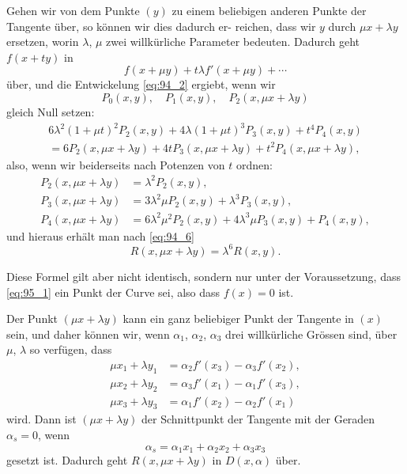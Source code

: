 \documentclass[12pt,a4paper]{article}
\theoremstyle{plain}
\theoremstyle{definition}
\theoremstyle{remark}
\begin{document}
Gehen wir von dem Punkte $(y)$ zu einem beliebigen anderen
Punkte der Tangente über, so können wir dies dadurch er-
reichen, dass wir $y$ durch $\mu x + \lambda y$ ersetzen, worin $\lambda$, $\mu$ zwei
willkürliche Parameter bedeuten. Dadurch geht $f(x + ty)$ in
\begin{equation*}
f(x + \mu y) + t\lambda f'(x + \mu y) + \cdots
\end{equation*}
über, und die Entwickelung \eqref{eq:94_2} ergiebt, wenn wir
\begin{equation*}
P_0(x, y), \quad P_1(x, y), \quad P_2(x, \mu x + \lambda y)
\end{equation*}
gleich Null setzen:
\begin{multline*}
6\lambda^2(1 + \mu t)^2 P_2(x, y) + 4\lambda(1 + \mu t)^3 P_3(x, y) + t^4 P_4(x, y) \\
= 6P_2(x, \mu x + \lambda y) + 4t P_3(x, \mu x + \lambda y) + t^2 P_4(x, \mu x + \lambda y),
\end{multline*}
also, wenn wir beiderseits nach Potenzen von $t$ ordnen:
\begin{align*}
P_2(x, \mu x + \lambda y) &= \lambda^2 P_2(x, y), \\
P_3(x, \mu x + \lambda y) &= 3\lambda^2 \mu P_2(x, y) + \lambda^3 P_3(x, y), \\
P_4(x, \mu x + \lambda y) &= 6\lambda^2 \mu^2 P_2(x, y) + 4\lambda^3 \mu P_3(x, y) + P_4(x, y),
\end{align*}
und hieraus erhält man nach \eqref{eq:94_6}
\begin{equation}\label{eq:95_11}
R(x, \mu x + \lambda y) = \lambda^6 R(x, y).
\end{equation}

Diese Formel gilt aber nicht identisch, sondern nur unter
der Voraussetzung, dass \eqref{eq:95_1} ein Punkt der Curve sei, also dass
$f(x) = 0$ ist.

Der Punkt $(\mu x + \lambda y)$ kann ein ganz beliebiger Punkt der
Tangente in $(x)$ sein, und daher können wir, wenn $\alpha_1$, $\alpha_2$, $\alpha_3$
drei willkürliche Grössen sind, über $\mu$, $\lambda$ so verfügen, dass
\begin{equation}\label{eq:95_12}
\begin{aligned}
\mu x_1 + \lambda y_1 &= \alpha_2 f'(x_3) - \alpha_3 f'(x_2), \\
\mu x_2 + \lambda y_2 &= \alpha_3 f'(x_1) - \alpha_1 f'(x_3), \\
\mu x_3 + \lambda y_3 &= \alpha_1 f'(x_2) - \alpha_2 f'(x_1)
\end{aligned}
\end{equation}
wird. Dann ist $(\mu x + \lambda y)$ der Schnittpunkt der Tangente mit
der Geraden $\alpha_s = 0$, wenn
\begin{equation}\label{eq:95_13}
\alpha_s = \alpha_1 x_1 + \alpha_2 x_2 + \alpha_3 x_3
\end{equation}
gesetzt ist. Dadurch geht $R(x, \mu x + \lambda y)$ in $D(x, \alpha)$ über.
\end{document}

